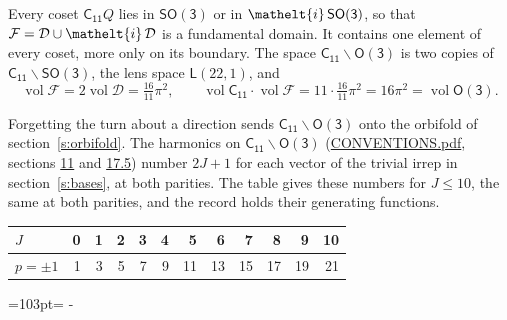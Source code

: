 \documentclass[10pt,a4paper]{article}
\newcommand{\needspace}[1]{\par\penalty-100\begingroup\dimen0=#1\relax\dimen2=\pagegoal
  \advance\dimen2-\pagetotal\ifdim\dimen0>\dimen2\relax\ifdim\dimen2>0pt\vfil\break\fi\fi
  \endgroup}
\numberwithin{equation}{section}
\newcommand{\eltfont}[1]{{\let\sigma\eltsigma\mathelt{#1}}}
\newcommand{\grp}[1]{\mathsf{#1}}
\newcommand{\elt}[1]{\eltfont{#1}}
\newcommand{\vol}{\operatorname{vol}}
\newcommand{\fcell}{\mathcal{D}}
\newcommand{\fdomain}{\mathcal{F}}
\newcommand{\lensspace}[2]{\mathsf{L}(#1, #2)}
\begin{document}
\leavevmode\label{n:set.fundamental}Every coset $\grp{C_{11}}Q$ lies in \href{SO3.pdf}{$\grp{SO(3)}$} or in $\elt{i}\,\grp{SO(3)}$, so that $\fdomain = \fcell \cup \elt{i}\,\fcell$ is a fundamental domain. It contains one element of every coset, more only on its boundary.
\leavevmode\label{n:set.lens}The space $\grp{C_{11}}\backslash\grp{O(3)}$ is two copies of $\grp{C_{11}}\backslash\grp{SO(3)}$, the lens space $\lensspace{22}{1}$, and
\begin{equation}\label{e:volume}\vol\fdomain = 2\vol\fcell = \tfrac{16}{11}\pi^2,\qquad \vol\grp{C_{11}}\cdot\vol\fdomain = 11\cdot \tfrac{16}{11}\pi^2 = 16\pi^2 = \vol\grp{O(3)}.\end{equation}

Forgetting the turn about a direction sends $\grp{C_{11}}\backslash\grp{O(3)}$ onto the orbifold of section~\ref{s:orbifold}.
The harmonics on $\grp{C_{11}}\backslash\grp{O(3)}$ (\href{../../CONVENTIONS.pdf}{CONVENTIONS.pdf}, sections \href{../../CONVENTIONS.pdf\#conv.11}{11} and \href{../../CONVENTIONS.pdf\#conv.17.5}{17.5}) number $2J + 1$ for each vector of the trivial irrep in section~\ref{s:bases}, at both parities. The table gives these numbers for $J \le 10$, the same at both parities, and the record holds their generating functions.
{\small\setlength{\tabcolsep}{4pt}\begin{longtable}{@{}lrrrrrrrrrrr@{}}\toprule
$J$ & 0 & 1 & 2 & 3 & 4 & 5 & 6 & 7 & 8 & 9 & 10\\\midrule\endhead
\bottomrule\endfoot\endlastfoot
$p = \pm 1$ & 1 & 3 & 5 & 7 & 9 & 11 & 13 & 15 & 17 & 19 & 21\\
\bottomrule\end{longtable}}
\needspace{103pt}
\end{document}
